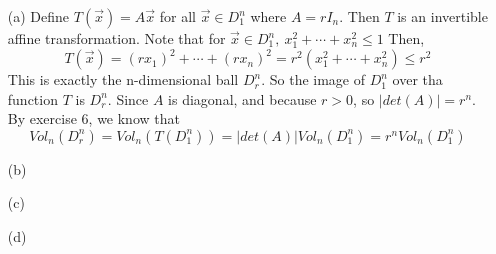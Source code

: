 \documentclass[11pt,letterpaper,cm]{nupset}
\begin{document}
\begin{solution}
	\begin{itemize}
		\item[(a)] Define $T(\vec{x})=A\vec{x}$ for all $\vec{x}\in D_1^n$ where $A = rI_n$. Then $T$ is an invertible affine transformation. Note that for $\vec{x}\in D_1^n,\ x_1^2+\cdots+x_n^2\leq 1$ Then, 
		$$T(\vec{x})=(rx_1)^2+\cdots+(rx_n)^2=r^2(x_1^2+\cdots+x_n^2)\leq r^2$$
		This is exactly the n-dimensional ball $D_r^n$. So the image of $D_1^n$ over tha function $T$ is $D_r^n$. Since $A$ is diagonal, and because $r>0$, so $|det(A)|=r^n$. By exercise 6, we know that 
		$$Vol_n(D_r^n)=Vol_n(T(D_1^n))=|det(A)|Vol_n(D_1^n)=r^nVol_n(D_1^n)$$
		\item[(b)]
		\item[(c)]
		\item[(d)]
	\end{itemize}
\end{solution}
\end{document}
